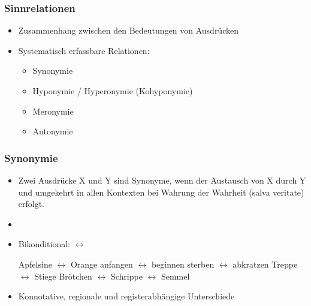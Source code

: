 \begin{frame}
\frametitle{Sinnrelationen}

\begin{itemize}
	\item Zusammenhang zwischen den Bedeutungen von Ausdrücken
	\item Systematisch erfassbare Relationen:
	
\vspace{5mm}
	
	\begin{itemize}
		\item Synonymie
		\item Hyponymie / Hyperonymie (Kohyponymie)
		\item Meronymie
 		\item Antonymie
	\end{itemize}
	
\end{itemize}

\end{frame}



\begin{frame}
\frametitle{Synonymie}

\begin{itemize}
	\item Zwei Ausdrücke X und Y sind Synonyme, wenn der Austausch von X durch Y und umgekehrt in allen Kontexten bei Wahrung der Wahrheit (salva veritate) erfolgt.
	\item[]
	\item Bikonditional: $\leftrightarrow$
	
	\eal
		\ex Apfelsine $\leftrightarrow$ Orange
		\ex anfangen $\leftrightarrow$ beginnen
		\ex sterben $\leftrightarrow$ abkratzen
		\ex Treppe $\leftrightarrow$ Stiege
		\ex Brötchen $\leftrightarrow$ Schrippe $\leftrightarrow$ Semmel
	\zl
	
	\item Konnotative, regionale und registerabhängige Unterschiede
\end{itemize}

\end{frame}



